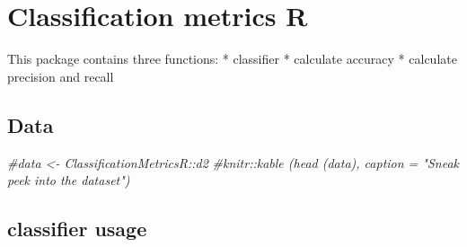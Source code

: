 \documentclass[
]{article}
\author{}
\date{\vspace{-2.5em}}
\newenvironment{Shaded}{\begin{snugshade}}{\end{snugshade}}
\newcommand{\AttributeTok}[1]{\textcolor[rgb]{0.13,0.29,0.53}{#1}}
\newcommand{\CommentTok}[1]{\textcolor[rgb]{0.56,0.35,0.01}{\textit{#1}}}
\newcommand{\ConstantTok}[1]{\textcolor[rgb]{0.56,0.35,0.01}{#1}}
\newcommand{\DecValTok}[1]{\textcolor[rgb]{0.00,0.00,0.81}{#1}}
\newcommand{\FunctionTok}[1]{\textcolor[rgb]{0.13,0.29,0.53}{\textbf{#1}}}
\newcommand{\NormalTok}[1]{#1}
\newcommand{\OtherTok}[1]{\textcolor[rgb]{0.56,0.35,0.01}{#1}}
\newcommand{\SpecialCharTok}[1]{\textcolor[rgb]{0.81,0.36,0.00}{\textbf{#1}}}
\newcommand{\StringTok}[1]{\textcolor[rgb]{0.31,0.60,0.02}{#1}}
\begin{document}
\hypertarget{classification-metrics-r}{%
\section{Classification metrics R}\label{classification-metrics-r}}

This package contains three functions: * classifier * calculate accuracy
* calculate precision and recall

\hypertarget{data}{%
\subsection{Data}\label{data}}

\begin{Shaded}
\begin{Highlighting}[]
\CommentTok{\#data \textless{}{-} ClassificationMetricsR::d2}
\CommentTok{\#knitr::kable (head (data), caption = "Sneak peek into the dataset")}
\end{Highlighting}
\end{Shaded}

\hypertarget{classifier-usage}{%
\subsection{classifier usage}\label{classifier-usage}}

\begin{Shaded}
\end{Shaded}
\end{document}
